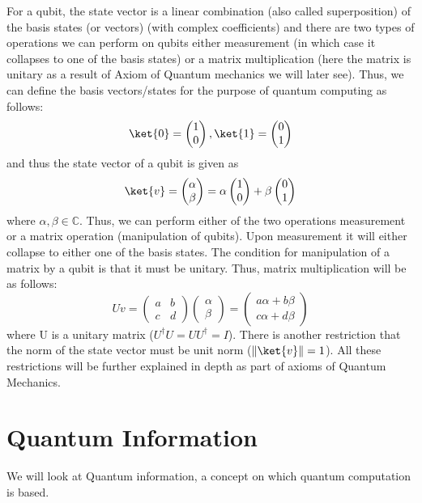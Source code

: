 \documentclass[12pt, oneside]{book}
\theoremstyle{definition}
\theoremstyle{definition}
\theoremstyle{remark}
\begin{document}
For a qubit, the state vector is a linear combination (also called superposition) of the basis states (or vectors) (with complex coefficients) and there are two types of operations we can perform on qubits either measurement (in which case it collapses to one of the basis states) or a matrix multiplication (here the matrix is unitary as a result of Axiom of Quantum mechanics we will later see). Thus, we can define the basis vectors/states for the purpose of quantum computing as follows:
\[
\ket{0}=\begin{pmatrix} 1 \\ 0 \end{pmatrix}, \ket{1}=\begin{pmatrix} 0 \\ 1 \end{pmatrix}
\]
and thus the state vector of a qubit is given as
\[
\ket{v}=\begin{pmatrix} \alpha \\ \beta \end{pmatrix} = \alpha \begin{pmatrix} 1 \\ 0 \end{pmatrix} + \beta \begin{pmatrix} 0 \\ 1 \end{pmatrix}
\]
where $\alpha,\beta \in \mathbb{C}$. Thus, we can perform either of the two operations measurement or a matrix operation (manipulation of qubits). Upon measurement it will either collapse to either one of the basis states. The condition for manipulation of a matrix by a qubit is that it must be unitary. Thus, matrix multiplication will be as follows:
\[
Uv=\begin{pmatrix} a & b \\ c & d \end{pmatrix}\begin{pmatrix} \alpha \\ \beta \end{pmatrix} =\begin{pmatrix} a \alpha + b\beta \\ c\alpha + d\beta \end{pmatrix}
\]
where U is a unitary matrix ($U^{\dagger}U=UU^{\dagger}=I$).
There is another restriction that the norm of the state vector must be unit norm ($\|\ket{v}\|=1$). All these restrictions will be further explained in depth as part of axioms of Quantum Mechanics.

\section{Quantum Information}
We will look at Quantum information, a concept on which quantum computation is based.
\end{document}
